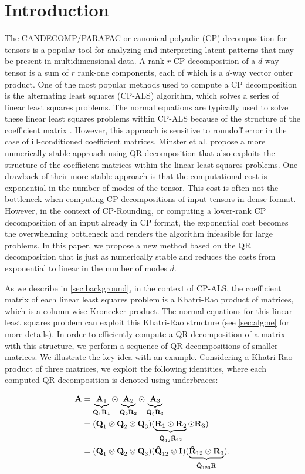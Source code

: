 \documentclass{article}
\newcommand{\M}[2][]{\bm{#1{\mathbf{\MakeUppercase{#2}}}}} 		%
\newcommand{\kr}{\odot}
\newcommand{\kron}{\otimes}
\begin{document}
\section{Introduction}
The CANDECOMP/PARAFAC or canonical polyadic (CP) decomposition for tensors is a popular tool for analyzing and interpreting latent patterns that may be present in multidimensional data. 
A rank-$r$ CP decomposition of a $d$-way tensor is a sum of $r$ rank-one components, each of which is a $d$-way vector outer product.
One of the most popular methods used to compute a CP decomposition is the alternating least squares (CP-ALS) algorithm, which solves a series of linear least squares problems. 
The normal equations are typically used to solve these linear least squares problems within CP-ALS because of the structure of the coefficient matrix \cite{kolda2009tensor}. 
However, this approach is sensitive to roundoff error in the case of ill-conditioned coefficient matrices. 
Minster et al. \cite{MVLB23} propose a more numerically stable approach using QR decomposition that also exploits the structure of the coefficient matrices within the linear least squares problems.
One drawback of their more stable approach is that the computational cost is exponential in the number of modes of the tensor.
This cost is often not the bottleneck when computing CP decompositions of input tensors in dense format.
However, in the context of CP-Rounding, or computing a lower-rank CP decomposition of an input already in CP format, the exponential cost becomes the overwhelming bottleneck and renders the algorithm infeasible for large problems.
In this paper, we propose a new method based on the QR decomposition that is just as numerically stable and reduces the costs from exponential to linear in the number of modes $d$.


As we describe in \cref{sec:background}, in the context of CP-ALS, the coefficient matrix of each linear least squares problem is a Khatri-Rao product of matrices, which is a column-wise Kronecker product.
The normal equations for this linear least squares problem can exploit this Khatri-Rao structure (see \cref{sec:alg:ne} for more details).
In order to efficiently compute a QR decomposition of a matrix with this structure, we perform a sequence of QR decompositions of smaller matrices.
We illustrate the key idea with an example.
Considering a Khatri-Rao product of three matrices, we exploit the following identities, where each computed QR decomposition is denoted using underbraces:

\begin{align}
\M{A} &= \underbrace{\M{A}_1}_{{\M{Q}_1\M{R}_1}} \kr \underbrace{\M{A}_2}_{{\M{Q}_2\M{R}_2}} \kr \underbrace{\M{A}_3}_{{\M{Q}_3\M{R}_3}}   \label{eq:qr} \\ 
&= (\M{Q}_1 \kron \M{Q}_2 \kron \M{Q}_3) (\underbrace{\M{R}_1 \kr \M{R}_2}_{\M[\hat]{Q}_{12} \M[\hat]{R}_{12}} \kr \M{R}_3)  \label{eq:re} \\
&= (\M{Q}_1 \kron \M{Q}_2 \kron \M{Q}_3) (\M[\hat]{Q}_{12} \kron \M{I}) (\underbrace{\M[\hat]{R}_{12} \kr \M{R}_3}_{\M[\hat]{Q}_{123} \M{R}}).  \label{eq:pw} 
\end{align}
\end{document}
